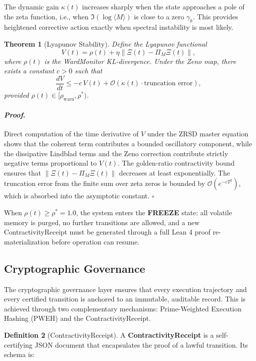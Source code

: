 \documentclass[12pt]{article}
\theoremstyle{plain}
\newtheorem{theorem}{Theorem}[section]
\theoremstyle{definition}
\newtheorem{definition}[theorem]{Definition}
\theoremstyle{remark}
\renewenvironment{proof}{\paragraph{\textit{Proof}.}}{\hfill$\square$}
\begin{document}
The dynamic gain $\kappa(t)$ increases sharply when the state approaches a pole of the zeta function, i.e., when $\Im(\log \langle M \rangle)$ is close to a zero $\gamma_k$. This provides heightened corrective action exactly when spectral instability is most likely.

\begin{theorem}[Lyapunov Stability]
Define the Lyapunov functional
\[
V(t) = \rho(t) + \eta\|\Xi(t) - \Pi_M\Xi(t)\|,
\]
where $\rho(t)$ is the WardMonitor KL-divergence. Under the Zeno map, there exists a constant $c > 0$ such that
\[
\frac{dV}{dt} \leq -c\, V(t) + \mathcal{O}(\kappa(t) \cdot \text{truncation error}),
\]
provided $\rho(t) \in [\rho_{\text{warn}}, \rho^*)$.
\end{theorem}

\begin{proof}
Direct computation of the time derivative of $V$ under the ZRSD master equation shows that the coherent term contributes a bounded oscillatory component, while the dissipative Lindblad terms and the Zeno correction contribute strictly negative terms proportional to $V(t)$. The golden-ratio contractivity bound ensures that $\|\Xi(t) - \Pi_M\Xi(t)\|$ decreases at least exponentially. The truncation error from the finite sum over zeta zeros is bounded by $\mathcal{O}(e^{-cT^2})$, which is absorbed into the asymptotic constant.
\end{proof}

When $\rho(t) \geq \rho^* = 1.0$, the system enters the \textbf{FREEZE} state: all volatile memory is purged, no further transitions are allowed, and a new ContractivityReceipt must be generated through a full Lean 4 proof re-materialization before operation can resume.

\subsection{Cryptographic Governance}

The cryptographic governance layer ensures that every execution trajectory and every certified transition is anchored to an immutable, auditable record. This is achieved through two complementary mechanisms: Prime-Weighted Execution Hashing (PWEH) and the ContractivityReceipt.

\begin{definition}[ContractivityReceipt]
A \textbf{ContractivityReceipt} is a self-certifying JSON document that encapsulates the proof of a lawful transition. Its schema is:
\end{definition}
\end{document}
